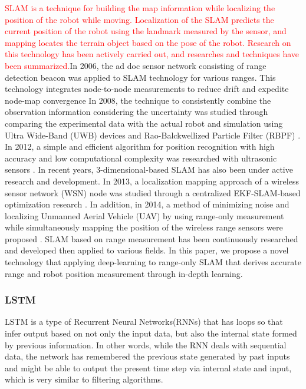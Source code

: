 \documentclass[letterpaper, 10 pt, conference]{ieeeconf}  %
\begin{document}
\textcolor{red}{SLAM is a technique for building the map information while localizing the position of the robot while moving. Localization of the SLAM predicts the current position of the robot using the landmark measured by the sensor, and mapping locates the terrain object based on the pose of the robot. Research on this technology has been actively carried out, and researches and techniques have been summarized.}In 2006, the ad doc sensor network consisting of range detection beacon was applied to SLAM technology for various ranges. This technology integrates node-to-node measurements to reduce drift and expedite node-map convergence \cite{djugash2006range} In 2008, the technique to consistently combine the observation information considering the uncertainty was studied through comparing the experimental data with the actual robot and simulation using Ultra Wide-Band (UWB) devices and Rao-Balckwellized Particle Filter (RBPF) \cite{blanco2008pure}.  In 2012, a simple and efficient algorithm for position recognition with high accuracy and low computational complexity was researched with ultrasonic sensors \cite{yang2012efficient}. In recent years, 3-dimensional-based SLAM has also been under active research and development. In 2013, a localization mapping approach of a wireless sensor network (WSN) node was studied through a centralized EKF-SLAM-based optimization research \cite{fabresse2013undelayed}. In addition, in 2014, a method of minimizing noise and localizing Unmanned Aerial Vehicle (UAV) by using  range-only measurement while simultaneously mapping the position of the wireless range sensors were proposed \cite{fabresse2014robust}. 
SLAM based on range measurement has been continuously researched and developed then applied to various fields. In this paper, we propose a novel technology that applying deep-learning to range-only SLAM that derives accurate range and robot position measurement through in-depth learning. 


\subsubsection{LSTM}

LSTM is a type of Recurrent Neural Networks(RNNs) that has loops so that infer output based on not only the input data, but also the internal state formed by previous information. In other words, while the RNN deals with sequential data, the network has remembered the previous state generated by past inputs and might be able to output the present time step via internal state and input, which is very similar to filtering algorithms.
\end{document}
